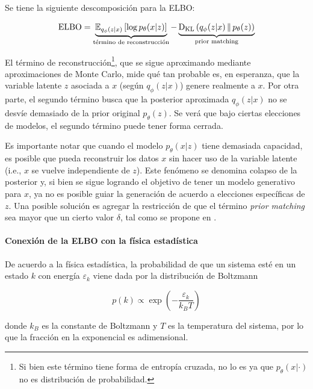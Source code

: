 \begin{prop}
    Se tiene la siguiente descomposición para la ELBO:

    \begin{equation}
        \label{eq:elbo_decomposition}
        \operatorname{ELBO}
        = \underbrace{\mathbb{E}_{q_\phi(z|x)}\left[\log p_\theta(x|z)\right]}_{\text{término de reconstrucción}}
        - \underbrace{\operatorname{D_{KL}}\left(q_\phi(z|x)\,\|\,p_\theta(z)\right)}_{\text{prior matching}}
    \end{equation}
\end{prop}

El término de reconstrucción\footnote{Si bien este término tiene forma de entropía cruzada, no lo es ya que $p_\theta(x|\cdot)$ no es distribución de probabilidad.}, que se sigue aproximando mediante aproximaciones de Monte Carlo, mide qué tan probable es, en esperanza, que la variable latente $z$ asociada a $x$ (según $q_\phi(z|x)$) genere realmente a $x$. Por otra parte, el segundo término busca que la posterior aproximada $q_\phi(z|x)$ no se desvíe demasiado de la prior original $p_\theta(z)$. Se verá que bajo ciertas elecciones de modelos, el segundo término puede tener forma cerrada.

Es importante notar que cuando el modelo $p_\theta(x|z)$ tiene demasiada capacidad, es posible que pueda reconstruir los datos $x$ sin hacer uso de la variable latente (i.e., $x$ se vuelve independiente de $z$). Este fenómeno se denomina colapso de la posterior y, si bien se sigue logrando el objetivo de tener un modelo generativo para $x$, ya no es posible guiar la generación de acuerdo a elecciones específicas de $z$. Una posible solución es agregar la restricción de que el término \textit{prior matching} sea mayor que un cierto valor $\delta$, tal como se propone en \cite{razavi2019preventing}.

\paragraph{Conexión de la ELBO con la física estadística}

De acuerdo a la física estadística, la probabilidad de que un sistema esté en un estado $k$ con energía $\varepsilon_k$ viene dada por la distribución de Boltzmann

\begin{equation}
	\label{eq:boltzmann}
	p(k) \propto \exp\left(-\frac{\varepsilon_k}{k_B T}\right)
\end{equation}

donde $k_B$ es la constante de Boltzmann y $T$ es la temperatura del sistema, por lo que la fracción en la exponencial es adimensional.

